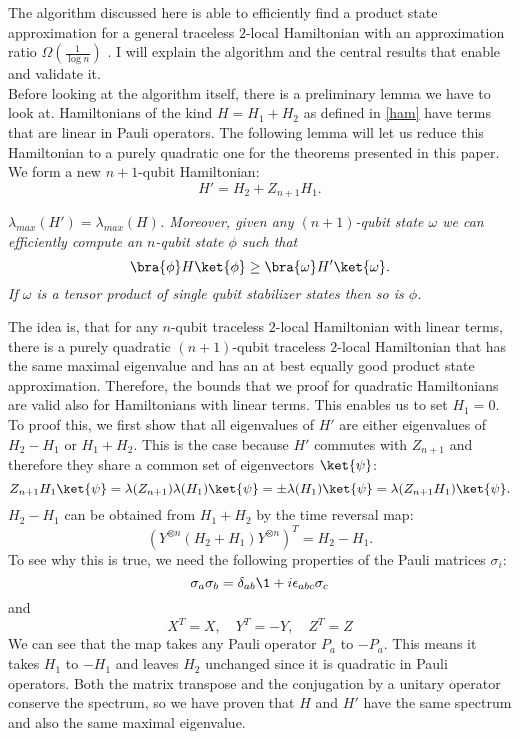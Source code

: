 The algorithm discussed here is able to efficiently find a product state approximation for a general traceless $2$-local Hamiltonian with an approximation ratio $\Omega(\frac{1}{\log n})$ \cite{bravyi19}.
I will explain the algorithm and the central results that enable and validate it.\\
Before looking at the algorithm itself, there is a preliminary lemma we have to look at.
Hamiltonians of the kind $H = H_1+H_2$ as defined in \eqref{ham} have terms that are linear in Pauli operators.
The following lemma will let us reduce this Hamiltonian to a purely quadratic one for the theorems presented in this paper.
We form a new $n+1$-qubit Hamiltonian: \[
H'=H_2+Z_{n+1}H_1
.\]

\begin{lma}
	\emph{$\lambda_{max}\left( H' \right) =\lambda_{max}\left( H \right)$. Moreover, given any $(n+1)$-qubit state  $\omega$ we can efficiently compute an $n$-qubit state $\phi$ such that \[
	\bra{\phi}H\ket{\phi} \ge \bra{\omega}H'\ket{\omega}
	.\]
If $\omega$ is a tensor product of single qubit stabilizer states then so is $\phi$.}
\end{lma}
\noindent The idea is, that for any $n$-qubit traceless $2$-local Hamiltonian with linear terms, there is a purely quadratic $(n+1)$-qubit traceless $2$-local Hamiltonian that has the same maximal eigenvalue and has an at best equally good product state approximation.
Therefore, the bounds that we proof for quadratic Hamiltonians are valid also for Hamiltonians with linear terms.
This enables us to set $H_1=0$.
To proof this, we first show that all eigenvalues of $H'$ are either eigenvalues of $H_2-H_1$ or $H_1+H_2$.
This is the case because $H'$ commutes with $Z_{n+1}$ and therefore they share a common set of eigenvectors $\ket{\psi}$: \[
Z_{n+1}H_1\ket{\psi} = \lambda(Z_{n+1})\lambda(H_1)\ket{\psi}=\pm \lambda(H_1)\ket{\psi} = \lambda(Z_{n+1}H_1)\ket{\psi}
.\]
$H_2-H_1$ can be obtained from $H_1+H_2$ by the time reversal map:
\[
	\left( Y^{\otimes n}\left( H_2+H_1 \right) Y^{\otimes n} \right) ^{T} = H_2-H_1
.\]
To see why this is true, we need the following properties of the Pauli matrices $\sigma_{i}$: \[
	\sigma_a\sigma_b=\delta_{ab}\1 + i\epsilon_{abc}\sigma_c
\]
and \[
	X^{T}=X, \quad Y^{T}=-Y, \quad Z^{T}=Z
\]
We can see that the map takes any Pauli operator $P_a$ to $-P_a$.
This means it takes  $H_1$ to $-H_1$ and leaves $H_2$ unchanged since it is quadratic in Pauli operators.
Both the matrix transpose and the conjugation by a unitary operator conserve the spectrum, so we have proven that  $H$ and $H'$ have the same spectrum and also the same maximal eigenvalue.
